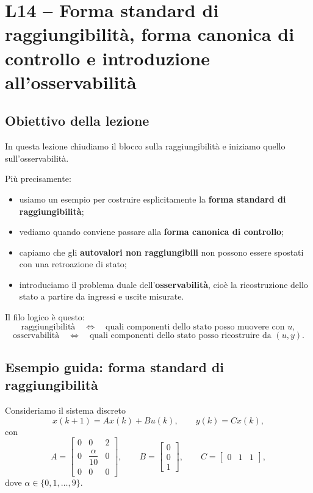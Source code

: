\chapter{L14 -- Forma standard di raggiungibilità, forma canonica di controllo e introduzione all'osservabilità}

\section{Obiettivo della lezione}

In questa lezione chiudiamo il blocco sulla raggiungibilità e iniziamo quello sull’osservabilità.

Più precisamente:
\begin{itemize}
    \item usiamo un esempio per costruire esplicitamente la \textbf{forma standard di raggiungibilità};
    \item vediamo quando conviene passare alla \textbf{forma canonica di controllo};
    \item capiamo che gli \textbf{autovalori non raggiungibili} non possono essere spostati con una retroazione di stato;
    \item introduciamo il problema duale dell’\textbf{osservabilità}, cioè la ricostruzione dello stato a partire da ingressi e uscite misurate.
\end{itemize}

\bigskip

Il filo logico è questo:
\[
\text{raggiungibilità} \quad \Longleftrightarrow \quad \text{quali componenti dello stato posso muovere con } u,
\]
\[
\text{osservabilità} \quad \Longleftrightarrow \quad \text{quali componenti dello stato posso ricostruire da } (u,y).
\]

\section{Esempio guida: forma standard di raggiungibilità}

Consideriamo il sistema discreto
\[
x(k+1)=Ax(k)+Bu(k),\qquad y(k)=Cx(k),
\]
con
\[
A=
\begin{bmatrix}
0 & 0 & 2\\
0 & \dfrac{\alpha}{10} & 0\\
0 & 0 & 0
\end{bmatrix},
\qquad
B=
\begin{bmatrix}
0\\
0\\
1
\end{bmatrix},
\qquad
C=
\begin{bmatrix}
0 & 1 & 1
\end{bmatrix},
\]
dove \(\alpha\in\{0,1,\dots,9\}\).

